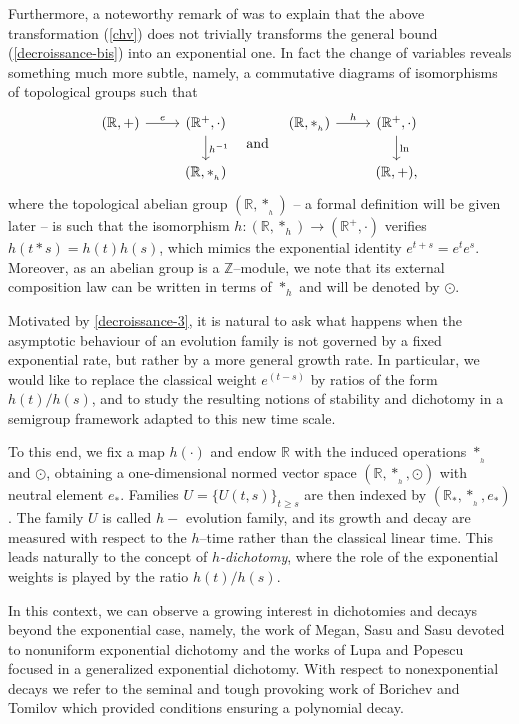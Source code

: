 \documentclass[10pt]{amsart}
\numberwithin{equation}{section}
\begin{document}
Furthermore, a noteworthy remark of \cite{JFP} was to explain that the above transformation (\ref{chv}) does not trivially transforms the general bound (\ref{decroissance-bis}) into an exponential one. In fact the change of variables reveals something much more subtle, namely, a commutative diagrams of isomorphisms of topological groups
such that
\[
\begin{tikzcd}
(\mathbb{R},+) \arrow{r}{e}  & (\mathbb{R}^{+},\cdot) \arrow{d}{h^{-1}} \\
& (\mathbb{R},*_{_h})
\end{tikzcd}
\quad \textnormal{and} \quad
\begin{tikzcd}
(\mathbb{R},*_{_h}) \arrow{r}{h} & (\mathbb{R}^{+},\cdot) \arrow{d}{\ln} \\
& (\mathbb{R},+),
\end{tikzcd}
\]
where the topological abelian group $(\mathbb{R},*_{_h})$ -- a formal definition will be given later -- is such that the isomorphism $h\colon  (\mathbb{R},\ast_{h})\to (\mathbb{R}^+, \cdot)$ verifies $h(t\ast s)=h(t)h(s)$,
which mimics the exponential identity $e^{t+s}=e^te^s$. Moreover, as an abelian group is a $\mathbb{Z}$--module,
we note that its external composition law can be written in terms of $*_{h}$ and will be denoted by $\odot$.

Motivated by \eqref{decroissance-3}, it is natural to ask what happens when the asymptotic behaviour of
an evolution family is not governed by a fixed exponential rate, but rather by a more
general growth rate. In particular, we would like to replace the classical weight
$e^{(t-s)}$ by ratios of the form $h(t)/h(s)$, and to study the resulting
notions of stability and dichotomy in a semigroup framework adapted to this new time
scale.


To this end, we fix a map $h(\cdot)$ and endow $\mathbb{R}$ with the induced
operations $*_{_h}$ and $\odot$, obtaining a one-dimensional normed vector space
$(\mathbb{R},*_{_h},\odot)$ with neutral element $e_*$. 
Families
$U = \{U(t,s)\}_{t\ge s}$ are then indexed by $(\mathbb{R}_*,*_{_h},e_*)$. The family $U$ is called $h-$ evolution family,  and its growth and decay 
are measured with respect to the $h$–time rather than the classical
linear time. This leads naturally to the concept of \emph{$h$-dichotomy}, where the
role of the exponential weights is played by the ratio $h(t)/h(s)$.







In this context, we can observe a growing interest in dichotomies and decays beyond the exponential case, namely, the work
of Megan, Sasu and Sasu \cite{MSS} devoted to nonuniform exponential dichotomy and the works of Lupa and Popescu \cite{Lupa2,Lupa} focused in a generalized exponential dichotomy. With respect to nonexponential decays we refer to the seminal and tough provoking work of Borichev and Tomilov \cite{BT} which provided conditions ensuring a polynomial decay.
\end{document}

